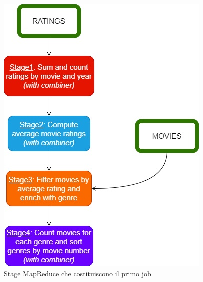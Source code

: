 \documentclass[10pt]{article}
\begin{document}
\begin{figure}[th]
	\centering
	\includegraphics[scale=0.85]{images/MapReduceFlow1.jpg}
	\caption{Stage MapReduce che costituiscono il primo job}
	\label{MapReduce1}
\end{figure}
\end{document}
